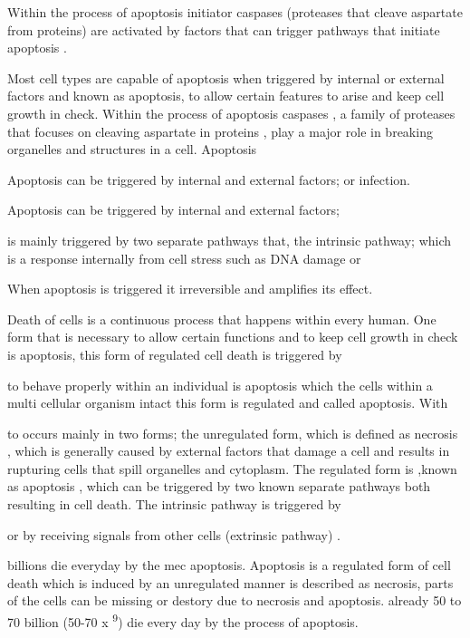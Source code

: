 Within the process of apoptosis initiator caspases (proteases that cleave aspartate from proteins) are activated by factors that can trigger pathways that initiate apoptosis \cite{}.




Most cell types are capable of apoptosis when triggered by internal or external factors and  
 known as apoptosis, to allow certain features to arise and keep cell growth in check.  Within the process of apoptosis caspases , a family of proteases that focuses on cleaving aspartate in proteins \cite{??????????},  play a major role in breaking organelles and structures in a cell. Apoptosis 

Apoptosis can be triggered by internal and external factors; or infection. \cite{?????}


Apoptosis can be triggered by internal and external factors; 

 is mainly triggered by two separate pathways that, the intrinsic pathway; which is a response internally from cell stress such as DNA damage or 

When apoptosis is triggered it irreversible and amplifies its effect.

Death of cells is a continuous process that happens within every human. One form that is necessary to allow certain functions and to keep cell growth in check is apoptosis, this form of regulated cell death is triggered by 



to behave properly within an individual is apoptosis which the cells within a multi cellular organism intact this form is regulated and called apoptosis. With 


  to occurs mainly in two forms; the unregulated form, which is defined as necrosis \cite{??????}, which is generally caused by external factors that damage a cell and results in rupturing cells that spill organelles and cytoplasm. The regulated form is ,known as apoptosis \cite{????????} , which can be triggered by two known separate pathways both resulting in cell death. The intrinsic pathway is triggered by 

 or by receiving signals from other cells (extrinsic pathway) \cite{}. 

billions die everyday by the mec apoptosis. Apoptosis is a regulated form of cell death which is induced by  an unregulated manner is described as necrosis, parts of the cells can be missing or destory due to necrosis and apoptosis.  already 50 to 70 billion (50-70 x \textsuperscript{9}) die every day \cite{} by the process of apoptosis. 

